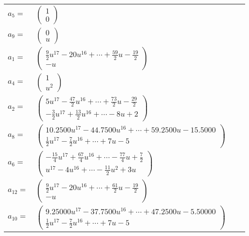 \documentclass[1p]{elsarticle_modified}
\theoremstyle{definition}
\begin{document}
\begin{tabular}{m{7pt} m{180pt} m{7pt} m{180pt} }
\flushright $a_{5}=$&$\begin{pmatrix}1\\0\end{pmatrix}$ \\
\flushright $a_{9}=$&$\begin{pmatrix}0\\u\end{pmatrix}$ \\
\flushright $a_{1}=$&$\begin{pmatrix}\frac{9}{2} u^{17}-20 u^{16}+\cdots+\frac{59}{2} u-\frac{19}{2}\\- u\end{pmatrix}$ \\
\flushright $a_{4}=$&$\begin{pmatrix}1\\u^2\end{pmatrix}$ \\
\flushright $a_{2}=$&$\begin{pmatrix}5 u^{17}-\frac{47}{2} u^{16}+\cdots+\frac{73}{2} u-\frac{29}{2}\\-\frac{3}{2} u^{17}+\frac{13}{2} u^{16}+\cdots-8 u+2\end{pmatrix}$ \\
\flushright $a_{8}=$&$\begin{pmatrix}10.2500 u^{17}-44.7500 u^{16}+\cdots+59.2500 u-15.5000\\\frac{1}{2} u^{17}-\frac{7}{2} u^{16}+\cdots+7 u-5\end{pmatrix}$ \\
\flushright $a_{6}=$&$\begin{pmatrix}-\frac{15}{4} u^{17}+\frac{67}{4} u^{16}+\cdots-\frac{77}{4} u+\frac{7}{2}\\u^{17}-4 u^{16}+\cdots-\frac{11}{2} u^2+3 u\end{pmatrix}$ \\
\flushright $a_{12}=$&$\begin{pmatrix}\frac{9}{2} u^{17}-20 u^{16}+\cdots+\frac{61}{2} u-\frac{19}{2}\\- u\end{pmatrix}$ \\
\flushright $a_{10}=$&$\begin{pmatrix}9.25000 u^{17}-37.7500 u^{16}+\cdots+47.2500 u-5.50000\\\frac{1}{2} u^{17}-\frac{7}{2} u^{16}+\cdots+7 u-5\end{pmatrix}$ \\

\end{tabular}
\end{document}
